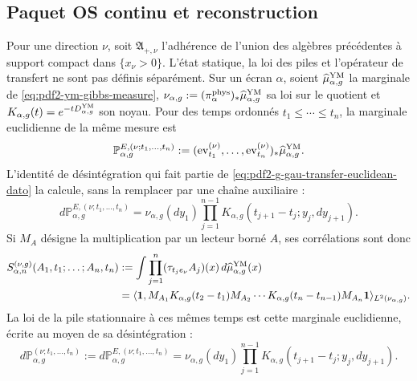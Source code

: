\subsection{Paquet OS continu et reconstruction}

Pour une direction $\nu$, soit $\mathfrak A_{+,\nu}$ l’adhérence de l’union des
algèbres précédentes à support compact dans $\{x_\nu>0\}$. L’état
statique, la loi des piles et l’opérateur de transfert ne sont pas définis
séparément. Sur un écran $\alpha$, soient
$\widehat\mu_{\alpha,g}^{\rm YM}$ la marginale de
\eqref{eq:pdf2-ym-gibbs-measure},
$\nu_{\alpha,g}:=(\pi_\alpha^{\rm phys})_*
\widehat\mu_{\alpha,g}^{\rm YM}$ sa loi sur le quotient et
$K_{\alpha,g}(t)=e^{-tD_{\alpha,g}^{\rm YM}}$ son noyau.
Pour des temps ordonnés $t_1\le\cdots\le t_n$, la marginale euclidienne de la
même mesure est
\begin{equation}\label{eq:pdf2-ym-owner-euclidean-time-marginal}
 \mathbb P_{\alpha,g}^{E,(\nu;t_1,\ldots,t_n)}
 :=(\operatorname{ev}_{t_1}^{(\nu)},\ldots,
    \operatorname{ev}_{t_n}^{(\nu)})_*
    \widehat\mu_{\alpha,g}^{\rm YM}.
\end{equation}
L'identité de désintégration qui fait partie de \eqref{eq:pdf2-g-gau-transfer-euclidean-dato} la calcule, sans la remplacer par une chaîne auxiliaire :
\begin{equation}\label{eq:pdf2-ym-owner-euclidean-markov-identification}
 d\mathbb P_{\alpha,g}^{E,(\nu;t_1,\ldots,t_n)}
 =\nu_{\alpha,g}(dy_1)
   \prod_{j=1}^{n-1}K_{\alpha,g}
      (t_{j+1}-t_j;y_j,dy_{j+1}).
\end{equation}
Si $M_A$ désigne la multiplication par un lecteur borné $A$, ses corrélations
sont donc
\begin{equation}\label{eq:pdf2-ym-owner-schwinger-transfer}
 \begin{aligned}
 S_{\alpha,n}^{(\nu,g)}(A_1,t_1;\ldots;A_n,t_n)
 &:=\int\prod_{j=1}^n(\tau_{t_je_\nu}A_j)(x)\,
       d\widehat\mu_{\alpha,g}^{\rm YM}(x)\\
 &=\langle\mathbf1,
 M_{A_1}K_{\alpha,g}(t_2-t_1)M_{A_2}\cdots
 K_{\alpha,g}(t_n-t_{n-1})M_{A_n}\mathbf1
 \rangle_{L^2(\nu_{\alpha,g})}.
 \end{aligned}
\end{equation}
La loi de la pile stationnaire à ces mêmes temps est cette marginale euclidienne, écrite au moyen de sa désintégration :
\begin{equation}\label{eq:pdf2-ym-owner-markov-stack-law}
 d\mathbb P_{\alpha,g}^{(\nu;t_1,\ldots,t_n)}
 :=d\mathbb P_{\alpha,g}^{E,(\nu;t_1,\ldots,t_n)}
 =\nu_{\alpha,g}(dy_1)
   \prod_{j=1}^{n-1}K_{\alpha,g}(t_{j+1}-t_j;y_j,dy_{j+1}).
\end{equation}
